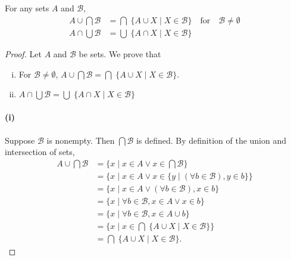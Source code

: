 \documentclass{report}
\begin{document}
\subsection{}%

For any sets $A$ and $\mathscr{B}$,
  \begin{align*}
    A \cup \bigcap \mathscr{B} & =
      \bigcap\; \{ A \cup X \mid X \in \mathscr{B} \}
        \quad\text{for}\quad \mathscr{B} \neq \emptyset \\
    A \cap \bigcup \mathscr{B} & =
      \bigcup\; \{ A \cap X \mid X \in \mathscr{B} \}
  \end{align*}

\begin{proof}

  Let $A$ and $\mathscr{B}$ be sets.
  We prove that
    \begin{enumerate}[(i)]
      \item For $\mathscr{B} \neq \emptyset$,
        $A \cup \bigcap \mathscr{B} =
         \bigcap\; \{ A \cup X \mid X \in \mathscr{B} \}$.
      \item $A \cap \bigcup \mathscr{B} =
             \bigcup\; \{ A \cap X \mid X \in \mathscr{B} \}$
    \end{enumerate}

  \paragraph{(i)}%

    Suppose $\mathscr{B}$ is nonempty.
    Then $\bigcap \mathscr{B}$ is defined.
    By definition of the union and intersection of sets,
      \begin{align*}
        A \cup \bigcap \mathscr{B}
          & = \{ x \mid x \in A \lor x \in \bigcap \mathscr{B} \} \\
          & = \{ x \mid x \in A \lor
            x \in \{ y \mid (\forall b \in \mathscr{B}), y \in b \}\} \\
          & = \{ x \mid x \in A \lor (\forall b \in \mathscr{B}), x \in b \} \\
          & = \{ x \mid \forall b \in \mathscr{B}, x \in A \lor x \in b \} \\
          & = \{ x \mid \forall b \in \mathscr{B}, x \in A \cup b \} \\
          & = \{ x \mid
            x \in \bigcap\; \{ A \cup X \mid X \in \mathscr{B} \}\} \\
          & = \bigcap\; \{ A \cup X \mid X \in \mathscr{B} \}.
      \end{align*}


\end{proof}
\end{document}
